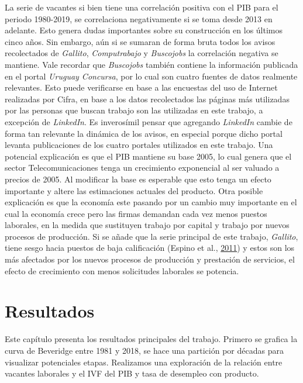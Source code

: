 \documentclass[12pt,oneside]{reedthesis}
\begin{document}
\begin{enumerate}
  La serie de vacantes si bien tiene una correlación positiva con el PIB para el periodo 1980-2019, se correlaciona negativamente si se toma desde 2013 en adelante. Esto genera dudas importantes sobre su construcción en los últimos cinco años. Sin embargo, aún si se sumaran de forma bruta todos los avisos recolectados de \emph{Gallito}, \emph{Computrabajo} y \emph{Buscojobs} la correlación negativa se mantiene. Vale recordar que \emph{Buscojobs} también contiene la información publicada en el portal \emph{Uruguay Concursa}, por lo cual son cuatro fuentes de datos realmente relevantes. Esto puede verificarse en base a las encuestas del uso de Internet realizadas por Cifra, en base a los datos recolectados las páginas más utilizadas por las personas que buscan trabajo son las utilizadas en este trabajo, a excepción de \emph{LinkedIn}. Es inverosímil pensar que agregando \emph{LinkedIn} cambie de forma tan relevante la dinámica de los avisos, en especial porque dicho portal levanta publicaciones de los cuatro portales utilizados en este trabajo. Una potencial explicación es que el PIB mantiene su base 2005, lo cual genera que el sector Telecomunicaciones tenga un crecimiento exponencial al ser valuado a precios de 2005. Al modificar la base es esperable que esto tenga un efecto importante y altere las estimaciones actuales del producto. Otra posible explicación es que la economía este pasando por un cambio muy importante en el cual la economía crece pero las firmas demandan cada vez menos puestos laborales, en la medida que sustituyen trabajo por capital y trabajo por nuevos procesos de producción. Si se añade que la serie principal de este trabajo, \emph{Gallito}, tiene sesgo hacia puestos de baja calificación (Espino et al., \protect\hyperlink{ref-Alma2011}{2011}) y estos son los más afectados por los nuevos procesos de producción y prestación de servicios, el efecto de crecimiento con menos solicitudes laborales se potencia.
\end{enumerate}
\hypertarget{Resultados}{%
\chapter{Resultados}\label{Resultados}}

Este capítulo presenta los resultados principales del trabajo. Primero se grafica la curva de Beveridge entre 1981 y 2018, se hace una partición por décadas para visualizar potenciales etapas. Realizamos una exploración de la relación entre vacantes laborales y el IVF del PIB y tasa de desempleo con producto.
\end{document}
